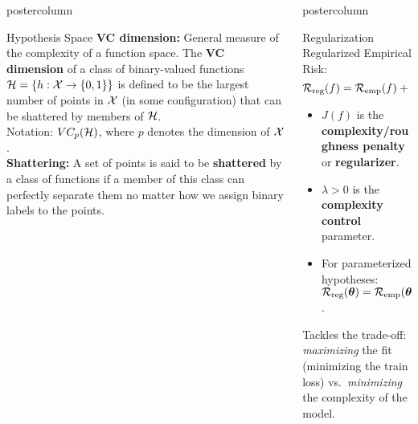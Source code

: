 \documentclass{beamer}
\newlength{\columnheight} %
\begin{document}
\begin{frame}[fragile]{}
\begin{columns}
\begin{column}{.31\textwidth}
\begin{beamercolorbox}[center]{postercolumn}
\begin{minipage}{.98\textwidth}
{\begin{myblock}{Hypothesis Space}
								\textbf{VC dimension:} General measure of the complexity of a function space.
								The \textbf{VC dimension} of a class of binary-valued functions $\mathcal{H} = \{h: \mathcal{X} \to \{0, 1\}\}$ is defined to be the largest number of points in $\mathcal{X}$ (in some configuration) that can be shattered by members of $\mathcal{H}$. \\
								Notation: $VC_p(\mathcal{H})$, where $p$ denotes the dimension of $\mathcal{X}$.\\
								\textbf{Shattering:} A set of points is said to be \textbf{shattered} by a class of functions if  a member of this class can perfectly separate them no matter how we assign binary labels to the points.
							\end{myblock}\vfill
						}
					\end{minipage}
				\end{beamercolorbox}
			\end{column}
			\begin{column}{.31\textwidth}
				\begin{beamercolorbox}[center]{postercolumn}
					\begin{minipage}{.98\textwidth}
						\parbox[t][\columnheight]{\textwidth}{
							\begin{myblock}{Regularization}  
								Regularized Empirical Risk:
								$$
								\mathcal{R}_{\text{reg}}(f) = \mathcal{R}_{\text{emp}}(f) + \lambda \cdot J(f)  
								$$
								\begin{itemize}
									\setlength{\itemindent}{+.3in}
									\item $J(f)$ is the \textbf{complexity/roughness penalty} or \textbf{regularizer}.
									\item $\lambda > 0$ is the \textbf{complexity control} parameter. 
									\item For parameterized hypotheses: $\mathcal{R}_{\text{reg}}(\bm{\theta}) = \mathcal{R}_{\text{emp}}(\bm{\theta}) + \lambda \cdot J(\bm{\theta})$. 
								\end{itemize}
								Tackles the trade-off: \emph{maximizing} the fit (minimizing the train loss) vs.\ \emph{minimizing} the complexity of the model. \\
								

\end{myblock}}
\end{minipage}
\end{beamercolorbox}
\end{column}
\end{columns}
\end{frame}
\end{document}
